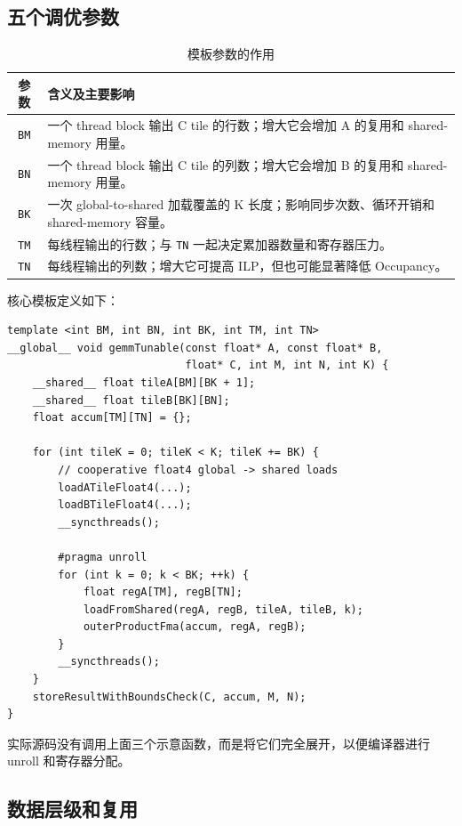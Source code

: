 \documentclass[UTF8,11pt,a4paper,fontset=fandol]{ctexart}
\newcommand{\code}[1]{\nolinkurl{#1}}
\begin{document}
\subsection{五个调优参数}

\begin{table}[H]
\centering
\caption{模板参数的作用}
\begin{tabularx}{\textwidth}{cX}
\toprule
参数 & 含义及主要影响 \\
\midrule
\code{BM} & 一个 thread block 输出 C tile 的行数；增大它会增加 A 的复用和 shared-memory 用量。 \\
\code{BN} & 一个 thread block 输出 C tile 的列数；增大它会增加 B 的复用和 shared-memory 用量。 \\
\code{BK} & 一次 global-to-shared 加载覆盖的 K 长度；影响同步次数、循环开销和 shared-memory 容量。 \\
\code{TM} & 每线程输出的行数；与 \code{TN} 一起决定累加器数量和寄存器压力。 \\
\code{TN} & 每线程输出的列数；增大它可提高 ILP，但也可能显著降低 Occupancy。 \\
\bottomrule
\end{tabularx}
\end{table}

核心模板定义如下：

\begin{lstlisting}[style=cuda,caption={参数化 GEMM kernel 的结构}]
template <int BM, int BN, int BK, int TM, int TN>
__global__ void gemmTunable(const float* A, const float* B,
                            float* C, int M, int N, int K) {
    __shared__ float tileA[BM][BK + 1];
    __shared__ float tileB[BK][BN];
    float accum[TM][TN] = {};

    for (int tileK = 0; tileK < K; tileK += BK) {
        // cooperative float4 global -> shared loads
        loadATileFloat4(...);
        loadBTileFloat4(...);
        __syncthreads();

        #pragma unroll
        for (int k = 0; k < BK; ++k) {
            float regA[TM], regB[TN];
            loadFromShared(regA, regB, tileA, tileB, k);
            outerProductFma(accum, regA, regB);
        }
        __syncthreads();
    }
    storeResultWithBoundsCheck(C, accum, M, N);
}
\end{lstlisting}

实际源码没有调用上面三个示意函数，而是将它们完全展开，以便编译器进行 unroll 和寄存器分配。

\subsection{数据层级和复用}
\end{document}
